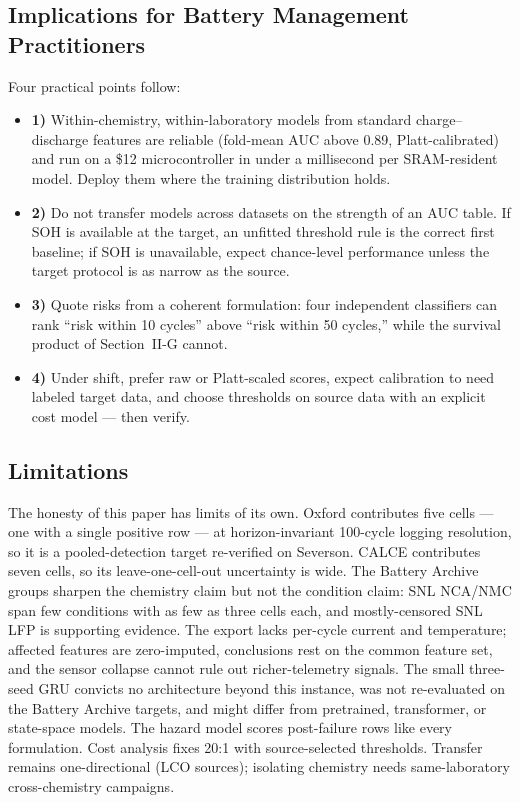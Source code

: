 \documentclass[preprint,12pt]{elsarticle}
\begin{document}
\subsection{Implications for Battery Management Practitioners}
Four practical points follow:
\begin{itemize}
\item \textbf{1)} Within-chemistry, within-laboratory models from standard charge--discharge features are reliable (fold-mean AUC above 0.89, Platt-calibrated) and run on a \$12 microcontroller in under a millisecond per SRAM-resident model. Deploy them where the training distribution holds.
\item \textbf{2)} Do not transfer models across datasets on the strength of an AUC table. If SOH is available at the target, an unfitted threshold rule is the correct first baseline; if SOH is unavailable, expect chance-level performance unless the target protocol is as narrow as the source.
\item \textbf{3)} Quote risks from a coherent formulation: four independent classifiers can rank ``risk within 10 cycles'' above ``risk within 50 cycles,'' while the survival product of Section~II-G cannot.
\item \textbf{4)} Under shift, prefer raw or Platt-scaled scores, expect calibration to need labeled target data, and choose thresholds on source data with an explicit cost model --- then verify.
\end{itemize}

\subsection{Limitations}
The honesty of this paper has limits of its own. Oxford contributes five cells --- one with a single positive row --- at horizon-invariant 100-cycle logging resolution, so it is a pooled-detection target re-verified on Severson. CALCE contributes seven cells, so its leave-one-cell-out uncertainty is wide. The Battery Archive groups sharpen the chemistry claim but not the condition claim: SNL NCA/NMC span few conditions with as few as three cells each, and mostly-censored SNL LFP is supporting evidence. The export lacks per-cycle current and temperature; affected features are zero-imputed, conclusions rest on the common feature set, and the sensor collapse cannot rule out richer-telemetry signals. The small three-seed GRU convicts no architecture beyond this instance, was not re-evaluated on the Battery Archive targets, and might differ from pretrained, transformer, or state-space models. The hazard model scores post-failure rows like every formulation. Cost analysis fixes 20:1 with source-selected thresholds. Transfer remains one-directional (LCO sources); isolating chemistry needs same-laboratory cross-chemistry campaigns.
\end{document}
